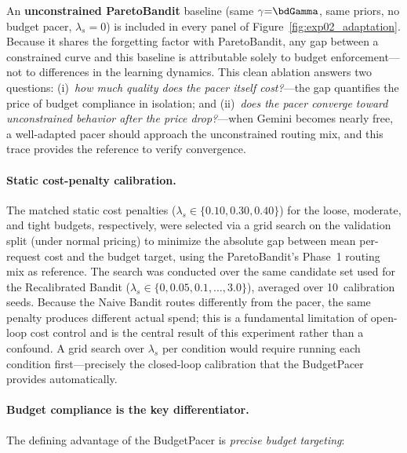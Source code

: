\noindent
An \textbf{unconstrained ParetoBandit} baseline (same $\gamma{=}\bdGamma$,
same priors, no budget pacer, $\lambda_s{=}0$) is included in
every panel of Figure~\ref{fig:exp02_adaptation}.
Because it shares the forgetting factor with ParetoBandit, any gap
between a constrained curve and this baseline is attributable solely
to budget enforcement---not to differences in the learning dynamics.
This clean ablation answers two questions:
(i)~\emph{how much quality does the pacer itself cost?}---the gap
quantifies the price of budget compliance in isolation; and
(ii)~\emph{does the pacer converge toward unconstrained behavior
after the price drop?}---when Gemini becomes nearly free, a
well-adapted pacer should approach the unconstrained routing mix,
and this trace provides the reference to verify convergence.

\paragraph{Static cost-penalty calibration.}
The matched static cost penalties ($\lambda_s \in \{0.10, 0.30,
0.40\}$) for the loose, moderate, and tight budgets, respectively,
were selected via a grid search on the validation split
(under normal pricing) to minimize the absolute gap between mean
per-request cost and the budget target, using the ParetoBandit's
Phase~1 routing mix as reference.
The search was conducted over the same candidate set used for the
Recalibrated Bandit ($\lambda_s \in \{0, 0.05, 0.1, \ldots, 3.0\}$),
averaged over 10~calibration seeds.
Because the Naive Bandit routes differently from
the pacer, the same penalty produces different actual spend;
this is a fundamental limitation of open-loop cost control and is
the central result of this experiment rather than a confound.
A grid search over $\lambda_s$ per condition would require running
each condition first---precisely the closed-loop calibration that
the BudgetPacer provides automatically.


\paragraph{Budget compliance is the key differentiator.}
The defining advantage of the BudgetPacer is \emph{precise budget
targeting}:

